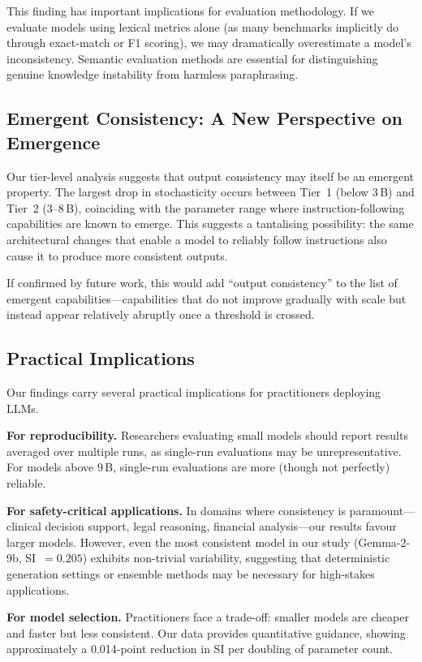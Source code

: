 \documentclass[11pt,a4paper]{article}
\begin{document}
This finding has important implications for evaluation methodology.
If we evaluate models using lexical metrics alone (as many benchmarks implicitly do through exact-match or F1 scoring), we may dramatically overestimate a model's inconsistency.
Semantic evaluation methods are essential for distinguishing genuine knowledge instability from harmless paraphrasing.

\subsection{Emergent Consistency: A New Perspective on Emergence}

Our tier-level analysis suggests that output consistency may itself be an emergent property.
The largest drop in stochasticity occurs between Tier~1 (below 3\,B) and Tier~2 (3--8\,B), coinciding with the parameter range where instruction-following capabilities are known to emerge.
This suggests a tantalising possibility: the same architectural changes that enable a model to reliably follow instructions also cause it to produce more consistent outputs.

If confirmed by future work, this would add ``output consistency'' to the list of emergent capabilities---capabilities that do not improve gradually with scale but instead appear relatively abruptly once a threshold is crossed.

\subsection{Practical Implications}

Our findings carry several practical implications for practitioners deploying LLMs.

\textbf{For reproducibility.}
Researchers evaluating small models should report results averaged over multiple runs, as single-run evaluations may be unrepresentative.
For models above 9\,B, single-run evaluations are more (though not perfectly) reliable.

\textbf{For safety-critical applications.}
In domains where consistency is paramount---clinical decision support, legal reasoning, financial analysis---our results favour larger models.
However, even the most consistent model in our study (Gemma-2-9b, SI~$= 0.205$) exhibits non-trivial variability, suggesting that deterministic generation settings or ensemble methods may be necessary for high-stakes applications.

\textbf{For model selection.}
Practitioners face a trade-off: smaller models are cheaper and faster but less consistent.
Our data provides quantitative guidance, showing approximately a 0.014-point reduction in SI per doubling of parameter count.
\end{document}
